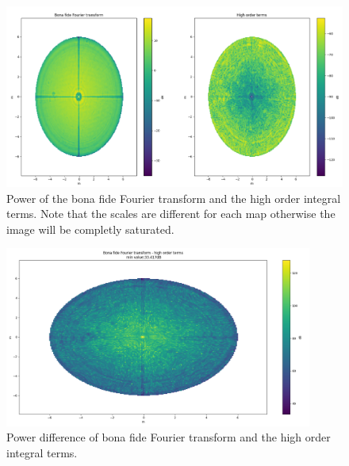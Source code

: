 \begin{figure}
    \centering
    \includegraphics[width=1\textwidth]{images/high_order_fft.png}
    \caption{Power of the bona fide Fourier transform and the high order integral terms. Note that the scales are different for each map otherwise the image will be completly saturated.}
    \label{fig:high_order_terms_power}
\end{figure}


\begin{figure}
    \centering
    \includegraphics[width=0.9\textwidth]{images/fft_high_order_difference.png}
    \caption{Power difference of bona fide Fourier transform and the high order integral terms.}
    \label{fig:high_order_terms_power_diff}
\end{figure}


